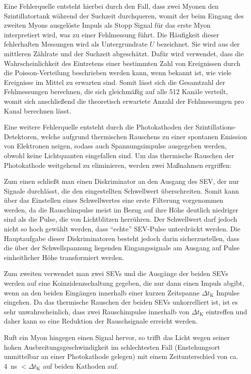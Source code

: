 Eine Fehlerquelle entsteht hierbei durch den Fall, dass zwei Myonen den Szin\-tillator\-tank während der Suchzeit durchqueren, womit der beim Eingang des zweiten Myons ausgelöste Impuls als Stopp Signal für das erste Myon interpretiert wird, was zu einer Fehlmessung führt. Die Häufigkeit dieser fehlerhaften Messungen wird als Untergrundrate $U$ bezeichnet. Sie wird aus der mittleren Zählrate und der Suchzeit abgeschätzt. Dafür wird verwendet, dass die Wahrscheinlichkeit des Eintretens einer bestimmten Zahl von Ereignissen durch die Poisson-Verteilung beschrieben werden kann, wenn bekannt ist, wie viele Ereignisse im Mittel zu erwarten sind. Somit lässt sich die Gesamtzahl der Fehlmessungen berechnen, die sich gleichmäßig auf alle 512 Kanäle verteilt, womit sich anschließend die theoretisch erwartete Anzahl der Fehlmessungen pro Kanal berechnen lässt.

Eine weitere Fehlerquelle entsteht durch die Photokathoden der Szintillations-De\-tek\-to\-ren, welche aufgrund thermischen Rauschens zu einer spontanen Emission von Elektronen neigen, sodass auch Spannungsimpulse ausgegeben werden, obwohl keine Lichtquanten eingefallen sind. Um das thermische Rauschen der Photokathode weitgehend zu eliminieren, werden zwei Maßnahmen ergriffen:

Zum einen schließt man einen Diskriminator an den Ausgang des SEV, der nur Signale durchlässt, die den eingestellten Schwellwert überschreiten. Somit kann über das Einstellen eines Schwellwertes eine erste Filterung vorgenommen werden, da die Rauschimpulse meist im Bezug auf ihre Höhe deutlich niedriger sind als die Pulse, die von Lichtblitzen herrühren. Der Schwellwert darf jedoch nicht so hoch gewählt werden, dass "`echte"' SEV-Pulse unterdrückt werden. Die Hauptaufgabe dieser Diskriminatoren besteht jedoch darin sicherzustellen, dass die über der Schwellspannung liegenden Eingangssignale am Ausgang auf Pulse einheitlicher Höhe transformiert werden.

Zum zweiten verwendet man zwei SEVs und die Ausgänge der beiden SEVs werden auf eine Koinzidenzschaltung gegeben, die nur dann einen Impuls abgibt, wenn an den beiden Eingängen innerhalb einer kurzen Zeitspanne $\Delta t_{\textrm{K}}$ Impulse eingehen. Da das thermische Rauschen der beiden SEVs unkorrelliert ist, ist es sehr unwahrscheinlich, dass zwei Rauschimpulse innerhalb von $\Delta t_{\textrm{K}}$ eintreffen und daher kann so eine Reduktion der Rauschsignale erreicht werden.

Ruft ein Myon hingegen einen Signal hervor, so trifft das Licht wegen seiner hohen Ausbreitungsgeschwindigkeit im schlechtesten Fall (Enstehungsort unmittelbar an einer Photokathode gelegen) mit einem Zeitunterschied von ca. \SI{4}{ns} $ < \Delta t_{\textrm{K}}$ auf beiden Kathoden auf.

